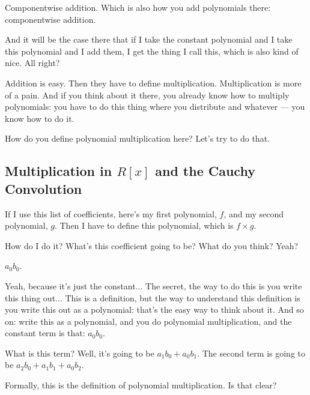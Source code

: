 \begin{speech}[01:26:30 - 01:27:08]
Componentwise addition. Which is also how you add polynomials there: componentwise addition.

And it will be the case there that if I take the constant polynomial and I take this polynomial and I add them,  I get the thing I call this, which is also kind of nice. All right?

Addition is easy. Then they have to define multiplication. Multiplication is more of a pain. And if you think about it there, you already know how to multiply polynomials: you have to do this thing where you distribute and whatever --- you know how to do it.

How do you define polynomial multiplication here? Let's try to do that.
\end{speech}

\subsection{Multiplication in \texorpdfstring{$R[x]$}{R[x]} and the Cauchy Convolution}

\begin{speech}[01:27:08 - 01:27:43]
If I use this list of coefficients, here's my first polynomial, $f$,  and my second polynomial, $g$.  Then I have to define this polynomial, which is $f \times g$. 

How do I do it? What's this coefficient going to be? What do you think? Yeah?
\end{speech}

\begin{student}
$a_0 b_0$.
\end{student}

\begin{speech}[01:27:44 - 01:28:55]
Yeah, because it's just the constant... The secret, the way to do this is you write this thing out... This is a definition, but the way to understand this definition is you write this out as a polynomial:  that's the easy way to think about it. And so on: write this as a polynomial,  and you do polynomial multiplication, and the constant term is that: $a_0 b_0$. 

What is this term? Well, it's going to be $a_1 b_0 + a_0 b_1$.  The second term is going to be $a_2 b_0 + a_1 b_1 + a_0 b_2$. 

Formally, this is the definition of polynomial multiplication. Is that clear?
\end{speech}

